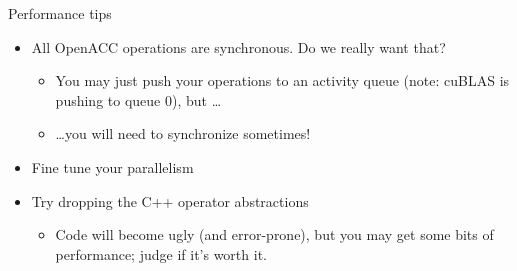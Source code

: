 \documentclass[12pt,aspectratio=169]{beamer}
\begin{document}
\begin{frame}{Performance tips}
  \begin{itemize}
  \item All OpenACC operations are synchronous. Do we really want that?
    \begin{itemize}
    \item You may just push your operations to an activity queue (note: cuBLAS is
      pushing to queue 0), but \dots
    \item \dots you will need to synchronize sometimes!
    \end{itemize}
    \vfill
  \item Fine tune your parallelism
    \vfill
  \item Try dropping the C++ operator abstractions
    \begin{itemize}
    \item Code will become ugly (and error-prone), but you may get some bits of
      performance; judge if it's worth it.
    \end{itemize}
  \end{itemize}
\end{frame}
\end{document}
